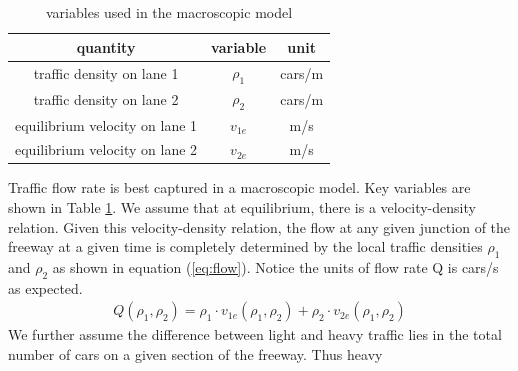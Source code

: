 \begin{table}[h]
	\begin{tabular}{|c|c|c|} \hline
	quantity & variable & unit \\ \hline
	traffic density on lane 1 & $\rho_1$ & cars/m \\ \hline
	traffic density on lane 2 & $\rho_2$ & cars/m \\ \hline
	equilibrium velocity on lane 1 & $v_{1e}$ & m/s \\ \hline
	equilibrium velocity on lane 2 & $v_{2e}$ & m/s \\ \hline
	\end{tabular}
	\caption{ variables used in the macroscopic model \label{tab:variables} }
	\end{table}	 
	
	Traffic flow rate is best captured in a macroscopic model. Key variables are shown in Table \ref{tab:variables}. We assume that at equilibrium, there is a velocity-density relation. Given this velocity-density relation, the flow at any given junction of the freeway at a given time is completely determined by the local traffic densities $\rho_1$ and $\rho_2$ as shown in equation (\ref{eq:flow}). Notice the units of flow rate Q is cars/s as expected.
	\begin{align}
	& Q(\rho_1,\rho_2) = \rho_1\cdot v_{1e}(\rho_1,\rho_2)+\rho_2\cdot v_{2e}(\rho_1,\rho_2) & \label{eq:flow}
	\end{align}
	We further assume the difference between light and heavy traffic lies in the total number of cars on a given section of the freeway. Thus heavy  

